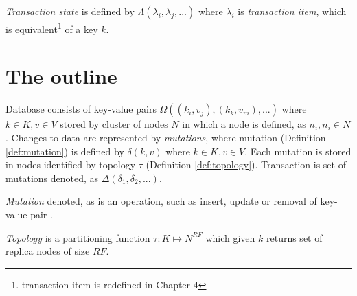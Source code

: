 

\emph{Transaction state} is defined by $\Lambda(\lambda_{i}, \lambda_{j}, ...)$ where $\lambda_{i}$ is \emph{transaction item}, which is equivalent\footnote{transaction item is redefined in Chapter 4} of a key $k$.

\section{The outline}
Database consists of key-value pairs $\Omega((k_{i},v_{j}), (k_{k},v_{m}),...)$ where $k\in\mathit{K}, v\in\mathit{V}$ stored by cluster of nodes $\mathit{N}$ in which a node is defined, as $n_{i}, n_{i}\in\mathit{N}$.
Changes to data are represented by \emph{mutations}, where mutation (Definition \ref{def:mutation}) is defined by $\delta(k,v)$ where $k \in \mathit{K}, v \in \mathit{V}$. 
Each mutation is stored in nodes identified by topology $\tau$ (Definition \ref{def:topology}).
Transaction is set of mutations denoted, as $\Delta(\delta_{1}, \delta_{2}, ...)$.

\begin{definition}
  \label{def:mutation}
  \emph{Mutation} denoted, as  is an operation, such as insert, update or removal of key-value pair \kv. 
\end{definition}

\begin{definition}
\label{def:topology}
\emph{Topology} is a partitioning function $\tau:\mathit{K} \mapsto \mathit{N^{RF}}$ which given $k$ returns set of replica nodes of size $\mathit{RF}$. 
\end{definition}


